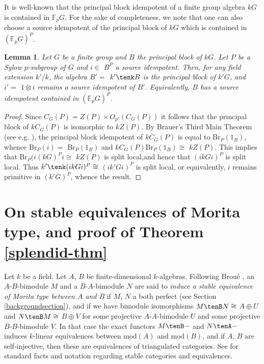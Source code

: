 \documentclass{amsart}
\theoremstyle{plain}\newtheorem{Theorem}{Theorem}[section]
\theoremstyle{plain}\newtheorem{Conjecture}[Theorem]{Conjecture}
\theoremstyle{plain}\newtheorem{Corollary}[Theorem]{Corollary}
\theoremstyle{plain}\newtheorem{Lemma}[Theorem]{Lemma}
\theoremstyle{plain}\newtheorem{Proposition}[Theorem]{Proposition}
\theoremstyle{definition}\newtheorem{Definition}[Theorem]{Definition}
\theoremstyle{definition}\newtheorem{Example}[Theorem]{Example}
\theoremstyle{definition}\newtheorem{Examples}[Theorem]{Examples}
\theoremstyle{definition}\newtheorem{Exercise}[Theorem]{Exercise}
\theoremstyle{definition}\newtheorem{Notation}[Theorem]{Notation}
\theoremstyle{definition}\newtheorem{Remark}[Theorem]{Remark}
\theoremstyle{definition}\newtheorem{Remarks}[Theorem]{Remarks}
\theoremstyle{plain}\newtheorem{Statement}[Theorem]{}
\def\F{{\mathbb F}}           \def\bM{\mathbf{M}}
\def\Fp{{\mathbb F_p}}
\def\Br{\mathrm{Br}}                 \def\ten{\otimes}
\def\modbar{\underline{\mathrm{mod}}}
\begin{document}
It is well-known that the principal block idempotent of a finite group algebra 
$kG$ is contained in $\F_p G$. For the sake of completeness, we note that 
one can also choose a source idempotent of the principal block of $kG$ which 
is contained in $(\Fp G)^P$.

\begin{Lemma} \label{Fpsource-Lemma}
Let $G$ be a finite group and $B$ the principal block of $kG$. Let $P$ be a
Sylow $p$-subgroup of $G$ and $i\in $ $B^P$ a source idempotent.
Then, for any field extension $k'/k$, the algebra $B'=$ $k'\tenk B$ is the principal
block of $k'G$, and $i'=$ $1\ten i$ remains a source idempotent of $B'$. 
Equivalently, $B$ has a source idempotent contained in $(\Fp G)^P$. 
\end{Lemma}

\begin{proof}
Since $C_G(P)=Z(P)\times O_{p'}(C_G(P))$ it follows that the principal block of
$kC_G(P)$ is isomorphic to $kZ(P)$. By Brauer's Third Main Theorem
(see e.g. \cite[Theorem 6.3.14]{LiBookII}),  the principal block idempotent of
$kC_G(P)$ is equal to $\Br_P(1_B)$, whence $\Br_P(i)=$ $\Br_P(1_B)$
and $kC_G(P)\Br_P(1_B)\cong$ $kZ(P)$. 
This implies  that $\Br_P(i(kG)^Pi\cong$ $kZ(P)$ is split local,and hence that
$(ikGi)^P$ is split local. Thus $k'\tenk (ikGi)^P\cong$
$(ik'Gi)^P$ is split local, or equivalently,  $i$ remains primitive in
$(k'G)^P$, whence the result. 
\end{proof}


\section{On stable equivalences of Morita type, and
proof of Theorem \ref{splendid-thm}} \label{stable-Section}


Let $k$ be a field. Let $A$, $B$ be finite-dimensional $k$-algebras. 
Following Brou\'e \cite[\S 5.A]{Broue94}, 
an $A$-$B$-bimodule $M$ and a $B$-$A$-bimodule $N$ are said
to {\em induce  a stable equivalence of Morita type between $A$ and $B$} if
$M$, $N$ a both perfect (see Section \ref{backgroundsection}), 
and if we have bimodule isomorphisms 
$M\tenB N\cong$ $A\oplus U$ and 
$N\tenB M\cong$ $B\oplus V$ for some projective $A$-$A$-bimodule $U$ and
some projective $B$-$B$-bimodule $V$. In that case the exact functors
$M\tenB-$ and $N\tenA-$ induces $k$-linear equivalences between  
$\modbar(A)$ and $\modbar(B)$, and if $A$, $B$ are self-injective, then these
are equivalences of triangulated categories.
 See \cite[Sections 2.13, 4.13]{LiBookI} for standard facts and notation
regarding stable categories and equivalences.
\end{document}
